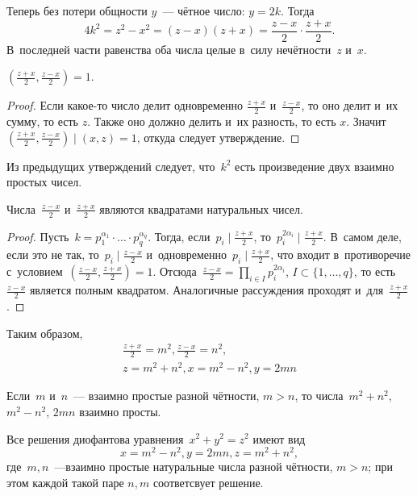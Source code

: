 \documentclass{article}
\begin{document}
Теперь без потери общности $y$~--- чётное число: $y=2k$. Тогда
$$4k^2=z^2-x^2=(z-x)(z+x)=\frac{z-x}{2}\cdot\frac{z+x}{2}.$$
В~последней части равенства оба числа целые в~силу нечётности~$z$ и~$x$.

\begin{claim}
  $(\frac{z+x}{2},\frac{z-x}{2})=1$.
\end{claim}
\begin{proof}
  Если какое-то число делит одновременно $\frac{z+x}{2}$ и~$\frac{z-x}{2}$, то
  оно делит и~их сумму, то есть $z$. Также оно должно делить и~их разность, то
  есть $x$. Значит $(\frac{z+x}{2},\frac{z-x}{2})\mid(x,z)=1$, откуда следует
  утверждение.
\end{proof}

Из предыдущих утверждений следует, что~$k^2$ есть произведение двух взаимно
простых чисел.

\begin{claim}
  Числа~$\frac{z-x}{2}$ и~$\frac{z+x}{2}$ являются квадратами натуральных чисел.
\end{claim}
\begin{proof}
  Пусть~$k=p_1^{\alpha_1} \cdot \ldots \cdot p_q^{\alpha_q}$.
  Тогда, если~$p_i \mid \frac{z+x}{2}$, то~$p_i^{2\alpha_i} \mid \frac{z+x}{2}$.
  В~самом деле, если это не так, то~$p_i \mid \frac{z-x}{2}$
  и~одновременно~$p_i \mid \frac{z+x}{2}$,
  что входит в~противоречие с~условием~$(\frac{z-x}{2},\frac{z+x}{2})=1$.
  Отсюда~$\frac{z-x}{2} = \prod\limits_{i \in I} p_{i}^{2\alpha_{i}}$,
  $I \subset \{1, \ldots, q\}$, то есть~$\frac{z-x}{2}$ является полным
  квадратом. Аналогичные рассуждения проходят и~для~$\frac{z+x}{2}$.
\end{proof}

Таким образом,
\begin{gather*}
\frac{z+x}{2} = m^2, \frac{z-x}{2} = n^2,\\
z = m^2 + n^2, x = m^2 - n^2, y = 2mn
\end{gather*}

\begin{exercise}
  Если~$m$ и~$n$~--- взаимно простые разной чётности, $m > n$, то
  числа~$m^2 + n^2$, $m^2 - n^2$, $2 m n$ взаимно просты.
\end{exercise}

\begin{conclusion}
  Все решения диофантова уравнения~$x^2+y^2=z^2$ имеют вид
  $$ x = m^2 - n^2, y = 2mn, z = m^2 + n^2, $$
  где~$m, n$~---взаимно простые натуральные числа разной чётности, $m > n$;
  при этом каждой такой паре $n, m$ соответсвует решение.
\end{conclusion}
\end{document}
